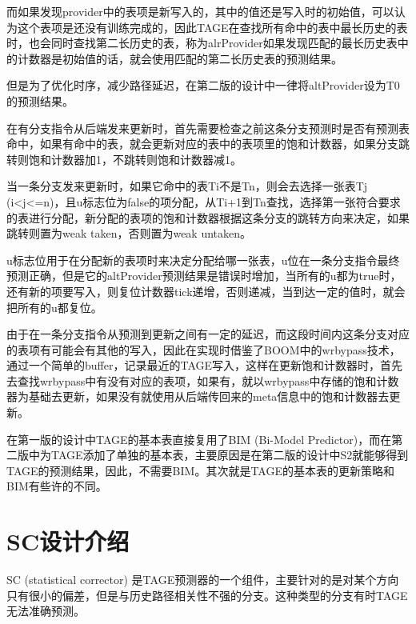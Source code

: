 而如果发现provider中的表项是新写入的，其中的值还是写入时的初始值，可以认为这个表项是还没有训练完成的，因此TAGE在查找所有命中的表中最长历史的表时，也会同时查找第二长历史的表，称为alrProvider如果发现匹配的最长历史表中的计数器是初始值的话，就会使用匹配的第二长历史表的预测结果。

但是为了优化时序，减少路径延迟，在第二版的设计中一律将altProvider设为T0的预测结果。


在有分支指令从后端发来更新时，首先需要检查之前这条分支预测时是否有预测表命中，如果有命中的表，就会更新对应的表中的表项里的饱和计数器，如果分支跳转则饱和计数器加1，不跳转则饱和计数器减1。

当一条分支发来更新时，如果它命中的表Ti不是Tn，则会去选择一张表Tj (i<j<=n)，且u标志位为false的项分配，从Ti+1到Tn查找，选择第一张符合要求的表进行分配，新分配的表项的饱和计数器根据这条分支的跳转方向来决定，如果跳转则置为weak taken，否则置为weak untaken。

u标志位用于在分配新的表项时来决定分配给哪一张表，u位在一条分支指令最终预测正确，但是它的altProvider预测结果是错误时增加，当所有的u都为true时，还有新的项要写入，则复位计数器tick递增，否则递减，当到达一定的值时，就会把所有的u都复位。

由于在一条分支指令从预测到更新之间有一定的延迟，而这段时间内这条分支对应的表项有可能会有其他的写入，因此在实现时借鉴了BOOM中的wrbypass技术，通过一个简单的buffer，记录最近的TAGE写入，这样在更新饱和计数器时，首先去查找wrbypass中有没有对应的表项，如果有，就以wrbypass中存储的饱和计数器为基础去更新，如果没有就使用从后端传回来的meta信息中的饱和计数器去更新。

在第一版的设计中TAGE的基本表直接复用了BIM (Bi-Model Predictor)，而在第二版中为TAGE添加了单独的基本表，主要原因是在第二版的设计中S2就能够得到TAGE的预测结果，因此，不需要BIM。其次就是TAGE的基本表的更新策略和BIM有些许的不同。


\section{SC设计介绍}

SC (statistical corrector) 是TAGE预测器的一个组件，主要针对的是对某个方向只有很小的偏差，但是与历史路径相关性不强的分支\cite{tage-sc-l, isl-tage}。这种类型的分支有时TAGE无法准确预测。

